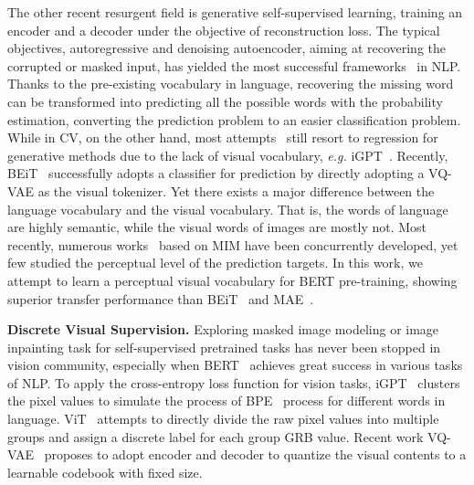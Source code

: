 \documentclass[letterpaper]{article} \usepackage{aaai23}  \usepackage{times}  \usepackage{helvet}  \usepackage{courier}  \usepackage[hyphens]{url}  \usepackage{graphicx} \urlstyle{rm} \def\UrlFont{\rm}  \usepackage{natbib}  \usepackage{caption} \frenchspacing  \setlength{\pdfpagewidth}{8.5in}  \setlength{\pdfpageheight}{11in}  \usepackage{algorithm}
\newcommand{\eg}{\textit{e.g. }}
\begin{document}
The other recent resurgent field is generative self-supervised learning, 
training an encoder and a decoder under the objective of reconstruction loss.
The typical 
objectives, autoregressive and denoising autoencoder, aiming at recovering the corrupted or masked input, has yielded the most successful frameworks~\cite{devlin2018bert,radford2018improving,radford2019language,brown2020language,liu2019roberta,joshi2020spanbert} in NLP. 
Thanks to the pre-existing vocabulary in language, recovering the missing word can be transformed into
predicting all the possible words with the probability estimation, converting the prediction problem to an easier classification problem.
While in CV, on the other hand, most attempts~\cite{van2016pixel,oord2016conditional,chen2020generative,he2021masked} still resort to regression for generative methods
due to the lack of visual vocabulary, 
\eg iGPT~\cite{chen2020generative}. 
Recently, BEiT~\cite{bao2021beit} successfully adopts a classifier for prediction by directly adopting a VQ-VAE as the visual tokenizer.
Yet there exists a major difference between the language vocabulary and the visual vocabulary.
That is, the words of language are highly semantic, while the visual words of images are mostly not.
Most recently, numerous works~\cite{bao2021beit,he2021masked,xie2021simmim,chen2022context,wang2022bevt,dong2022bootstrapped, baevski2022data2vec,zheng2022general} based on MIM have been concurrently developed,
yet few studied the perceptual level of the prediction targets.
In this work, we attempt to learn a perceptual visual vocabulary for BERT pre-training, showing superior transfer performance than BEiT~\cite{bao2021beit} and MAE~\cite{he2021masked}.


\noindent \textbf{Discrete Visual Supervision.}
Exploring masked image modeling or image inpainting task for self-supervised pretrained tasks has never been stopped in vision community, especially when BERT~\cite{devlin2018bert} achieves great success in various tasks of NLP. To apply the cross-entropy loss function for vision tasks, iGPT~\cite{chen2020generative} clusters the pixel values to simulate the process of BPE~\cite{sennrich2015neural} process for different words in language. ViT~\cite{dosovitskiy2020image} attempts to directly divide the raw pixel values into multiple groups and assign a discrete label for each group GRB value. Recent work VQ-VAE~\cite{oord2017neural} proposes to adopt encoder and decoder to quantize the visual contents to a learnable codebook with fixed size. 
\end{document}
